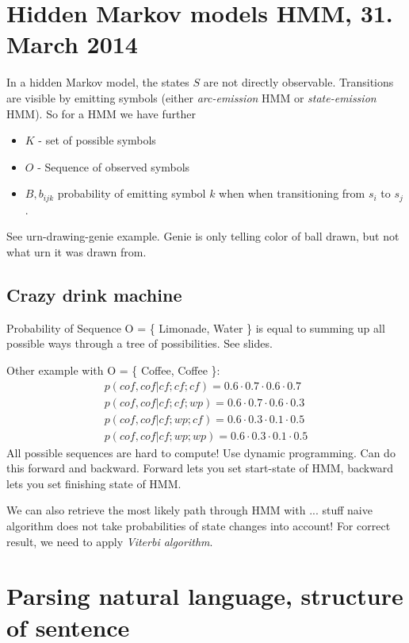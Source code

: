 \documentclass[11pt]{article}
\begin{document}
\section{Hidden Markov models HMM, 31. March 2014}
In a hidden Markov model, the states $S$ are not directly observable. Transitions are visible
by emitting symbols (either \emph{arc-emission} HMM or \emph{state-emission} HMM).
So for a HMM we have further
\begin{itemize}
	\item $K$ - set of possible symbols
	\item $O$ - Sequence of observed symbols
	\item $B, b_{ijk}$ probability of emitting symbol $k$ when when transitioning from 
	$s_i$ to $s_j$.
\end{itemize}

See urn-drawing-genie example. Genie is only telling color of ball drawn, but not what urn
it was drawn from. 

\subsection{Crazy drink machine}
Probability of Sequence O = \{ Limonade, Water \} is equal to summing up all possible ways
through a tree of possibilities. See slides.

Other example with O =  \{ Coffee, Coffee \}:
\begin{eqnarray*}
	p(cof, cof | cf; cf; cf) = 0.6 \cdot 0.7\cdot 0.6 \cdot 0.7 \\
	p(cof, cof | cf; cf; wp) = 0.6 \cdot 0.7\cdot 0.6\cdot0.3 \\
	p(cof, cof | cf; wp; cf) = 0.6 \cdot 0.3\cdot 0.1\cdot 0.5 \\
	p(cof, cof | cf; wp; wp) = 0.6 \cdot 0.3\cdot 0.1\cdot 0.5
\end{eqnarray*}
All possible sequences are hard to compute! Use dynamic programming. Can do this forward
and backward. Forward lets you set start-state of HMM, backward lets you set finishing
state of HMM.

We can also retrieve the most likely path through HMM with ... stuff naive algorithm does
 not take probabilities of state changes into account! For correct result, we need to
 apply \emph{Viterbi algorithm}.
 
\section{Parsing natural language, structure of sentence}
\end{document}

